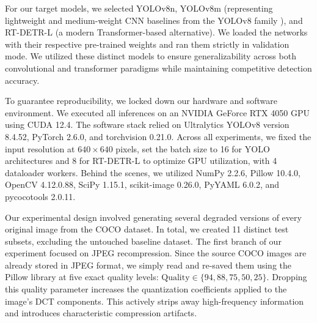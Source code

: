 \documentclass[12pt, a4paper]{article}
\begin{document}
For our target models, we selected YOLOv8n, YOLOv8m (representing lightweight and medium-weight CNN baselines from the YOLOv8 family \cite{jocher2023}), and RT-DETR-L (a modern Transformer-based alternative). We loaded the networks with their respective pre-trained weights and ran them strictly in validation mode. We utilized these distinct models to ensure generalizability across both convolutional and transformer paradigms while maintaining competitive detection accuracy.

To guarantee reproducibility, we locked down our hardware and software environment. We executed all inferences on an NVIDIA GeForce RTX 4050 GPU using CUDA 12.4. The software stack relied on Ultralytics YOLOv8 version 8.4.52, PyTorch 2.6.0, and torchvision 0.21.0. Across all experiments, we fixed the input resolution at $640 \times 640$ pixels, set the batch size to 16 for YOLO architectures and 8 for RT-DETR-L to optimize GPU utilization, with 4 dataloader workers. Behind the scenes, we utilized NumPy 2.2.6, Pillow 10.4.0, OpenCV 4.12.0.88, SciPy 1.15.1, scikit-image 0.26.0, PyYAML 6.0.2, and pycocotools 2.0.11.

Our experimental design involved generating several degraded versions of every original image from the COCO dataset. In total, we created 11 distinct test subsets, excluding the untouched baseline dataset. The first branch of our experiment focused on JPEG recompression. Since the source COCO images are already stored in JPEG format, we simply read and re-saved them using the Pillow library at five exact quality levels: $\text{Quality} \in \{94, 88, 75, 50, 25\}$. Dropping this quality parameter increases the quantization coefficients applied to the image's DCT components. This actively strips away high-frequency information and introduces characteristic compression artifacts.
\end{document}
